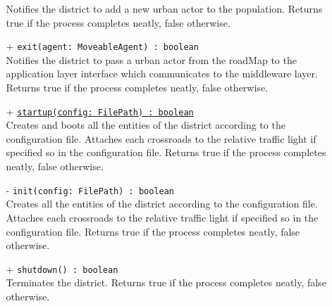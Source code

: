 \begin{itemize}
\begin{itemize}
    Notifies the district to add a new urban actor to the population.
    Returns true if the process completes neatly, false otherwise.
    \item[+] \texttt{exit(agent: MoveableAgent) : boolean} \\
    Notifies the district to pass a urban actor from the roadMap to the 
    application layer interface which communicates to the middleware layer.
    Returns true if the process completes neatly, false otherwise.
    \item[+] \texttt{\underline{startup(config: FilePath) : boolean}} \\
    Creates and boots all the entities of the district according to the 
    configuration file. Attaches each crossroads to the relative traffic light
    if specified so in the configuration file. 
    Returns true if the process completes neatly, false otherwise.
    \item[-] \texttt{init(config: FilePath) : boolean} \\
    Creates all the entities of the district according to the 
    configuration file. Attaches each crossroads to the relative traffic light
    if specified so in the configuration file. 
    Returns true if the process completes neatly, false otherwise.
    \item[+] \texttt{shutdown() : boolean} \\
    Terminates the district. Returns true if the process completes neatly,
    false otherwise.
  \end{itemize}
\end{itemize} 
